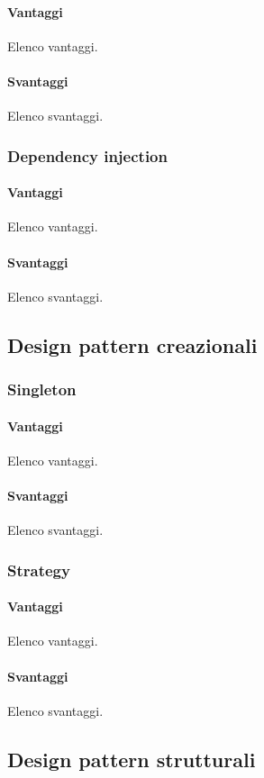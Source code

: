 \documentclass[../SpecificaTecnica.tex]{subfiles}
\begin{document}
				\paragraph{Vantaggi}
					Elenco vantaggi.
				\paragraph{Svantaggi}
					Elenco svantaggi.
			\subsubsection{Dependency injection}
			
				\paragraph{Vantaggi}
					Elenco vantaggi.
				\paragraph{Svantaggi}
					Elenco svantaggi.
	\subsection{Design pattern creazionali}
		\subsubsection{Singleton}
		
			\paragraph{Vantaggi}
				Elenco vantaggi.
			\paragraph{Svantaggi}
				Elenco svantaggi.
		\subsubsection{Strategy}
		
			\paragraph{Vantaggi}
				Elenco vantaggi.
			\paragraph{Svantaggi}
				Elenco svantaggi.
	\subsection{Design pattern strutturali}
\end{document}
